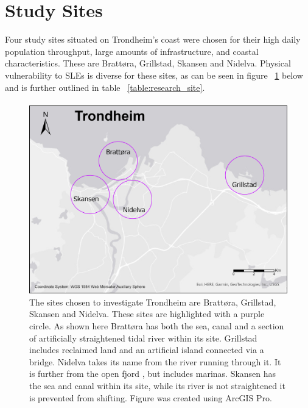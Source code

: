 \section{Study Sites}
Four study sites situated on Trondheim's coast were chosen for their high daily population throughput, large amounts of infrastructure, and coastal characteristics. These are Brattøra, Grillstad, Skansen and Nidelva. Physical vulnerability to SLEs is diverse for these sites, as can be seen in figure ~\ref{fig:research_site} below and is further outlined in table ~\ref{table:research_site}. 
\paragraph{}

\begin{figure} [H]
    \centering
    \includegraphics[width=1.0\textwidth]{fig/trondheim_research_sites_grey_circles.png}
    \caption[Research sites - Trondheim]{The sites chosen to investigate Trondheim are Brattøra, Grillstad, Skansen and Nidelva. These sites are highlighted with a purple circle. As shown here Brattøra has both the sea, canal and a section of artificially straightened tidal river within its site. Grillstad includes reclaimed land and an artificial island connected via a bridge. Nidelva takes its name from the river running through it. It is further from the open fjord , but includes marinas. Skansen has the sea and canal within its site, while its river is not straightened it is prevented from shifting. Figure was created using ArcGIS Pro.}
    \label{fig:research_site}
\end{figure}

